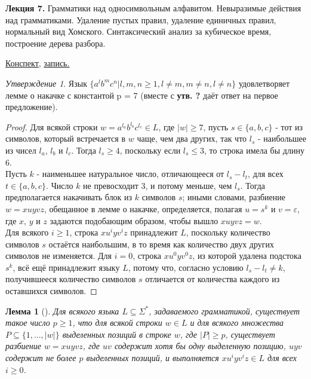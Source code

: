 \documentclass[a4paper]{article}
\newcommand{\mybox}{%
    \collectbox{%
        \setlength{\fboxsep}{1pt}%
        \fbox{\BOXCONTENT}%
    }%
}
\theoremstyle{indented}
\newtheorem{lemma}{Лемма}
\theoremstyle{definition}
\theoremstyle{remark}
\newtheorem{stat}{Утверждение}
\begin{document}
\textbf{Лекция 7.} Грамматики над односимвольным алфавитом. Невыразимые действия над грамматиками. Удаление пустых правил, удаление единичных правил, нормальный вид Хомского. Синтаксический анализ за кубическое время, построение дерева разбора.

\begin{flushright}
    \mybox{
        \href{https://users.math-cs.spbu.ru/~okhotin/teaching/tcs_fl_2021/okhotin_tcs_fl_2021_l7.pdf}{Конспект,}
        \href{https://disk.yandex.ru/d/knoQ44wLmGDwwQ/2021-2022%20учебный%20год%20(осенний%20семестр)/2%20курс/Теоретическая%20информатика/M2021-10-13_111709_1h40m_102.mp4}{запись.}
    }
\end{flushright}

\begin{stat}
    Язык $\{a^lb^mc^n | l,m,n \geq 1, l\neq m, m\neq n, l\neq n\}$ удовлетворяет лемме о накачке с константой p = 7 (вместе с \textbf{утв. ?} даёт ответ на первое предложение). 
\end{stat}

\begin{proof}
    Для всякой строки $w = a^{l_a} b^{l_b} c^{l_c} \in L$, где $|w| \geq 7$, пусть $s \in \{a, b, c\}$ - тот из символов, который встречается в $w$ чаще, чем два других, так что $l_s$ - наибольшее из чисел $l_a$, $l_b$ и $l_c$. Тогда $l_s \geq 4$, поскольку если $l_s \leq 3$, то строка имела бы длину 6. \\ 

    Пусть $k$ - наименьшее натуральное число, отличающееся от $l_s - l_t$, для всех $t \in \{a, b, c\}$. Число $k$ не превосходит 3, и потому меньше, чем $l_s$. Тогда предполагается накачивать блок из $k$ символов $s$; иными словами, разбиение $w = xuyvz$, обещанное в лемме о накачке, определяется, полагая $u = s^k$ и $v = \varepsilon$, где $x$, $y$ и $z$ задаются подобающим образом, чтобы вышло $xuyvz = w$. \\ 

    Для всякого $i \geq 1$, строка $xu^iyv^iz$ принадлежит $L$, поскольку количество символов $s$ остаётся наибольшим, в то время как количество двух других символов не изменяется. Для $i = 0$, строка $xu^0yv^0z$, из которой удалена подстока $s^k$, всё ещё принадлежит языку $L$, потому что, согласно условию $l_s - l_t \neq k$, получившееся количество символов $s$ отличается от количества каждого из оставшихся символов.
\end{proof}

\begin{lemma}[]
    Для всякого языка $L \subseteq \Sigma^*$, задаваемого грамматикой, существует такое число $p \geq 1$, что для всякой строки $w \in L$ и для всякого множества $P \subseteq \{1, \ldots , |w|\}$ выделенных позиций в строке $w$, где $|P | \geq p$, существует разбиение $w = xuyvz$, где $uv$ содержит хотя бы одну выделенную позицию, $uyv$ содержит не более $p$ выделенных позиций, и выполняется $xu^iyv^iz \in L$ для всех $i \geq 0$.
\end{lemma}
\end{document}

